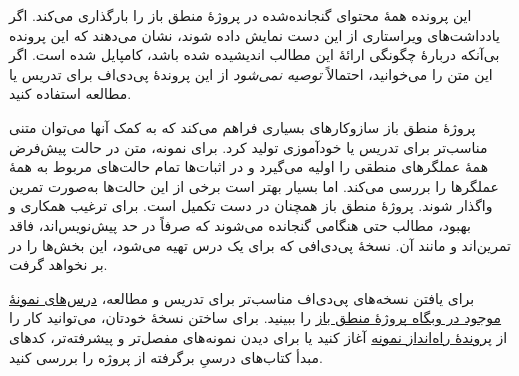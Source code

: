 \documentclass[../include/open-logic-part]{subfiles}
\begin{document}
\clearpage

\begin{editorial}
این پرونده همهٔ محتوای گنجانده‌شده در پروژهٔ منطق باز را بارگذاری
می‌کند. اگر یادداشت‌های ویراستاری از این دست نمایش داده شوند، نشان
می‌دهند که این پرونده بی‌آنکه دربارهٔ چگونگی ارائهٔ این مطالب اندیشیده
شده باشد، کامپایل شده است. اگر این متن را می‌خوانید، احتمالاً
\emph{توصیه نمی‌شود} از این پروندهٔ پی‌دی‌اف برای تدریس یا مطالعه
استفاده کنید.

پروژهٔ منطق باز سازوکارهای بسیاری فراهم می‌کند که به کمک آنها می‌توان
متنی مناسب‌تر برای تدریس یا خودآموزی تولید کرد. برای نمونه، متن در
حالت پیش‌فرض همهٔ عملگرهای منطقی را اولیه می‌گیرد و در اثبات‌ها تمام
حالت‌های مربوط به همهٔ عملگرها را بررسی می‌کند. اما بسیار بهتر است
برخی از این حالت‌ها به‌صورت تمرین واگذار شوند. پروژهٔ منطق باز همچنان
در دست تکمیل است. برای ترغیب همکاری و بهبود، مطالب حتی هنگامی
گنجانده می‌شوند که صرفاً در حد پیش‌نویس‌اند، فاقد تمرین‌اند و مانند آن.
نسخهٔ پی‌دی‌افی که برای یک درس تهیه می‌شود، این بخش‌ها را در بر نخواهد
گرفت.

برای یافتن نسخه‌های پی‌دی‌اف مناسب‌تر برای تدریس و مطالعه،
\href{http://builds.openlogicproject.org/}{درس‌های نمونهٔ موجود در
  وبگاه پروژهٔ منطق باز} را ببینید. برای ساختن نسخهٔ خودتان، می‌توانید
کار را از
\href{https://github.com/OpenLogicProject/OpenLogic/tree/master/courses/sample}{پروندهٔ
  راه‌انداز نمونه} آغاز کنید یا برای دیدن نمونه‌های مفصل‌تر و
پیشرفته‌تر، کدهای مبدأ کتاب‌های درسیِ برگرفته از پروژه را بررسی کنید.
\end{editorial}


















\end{document}
